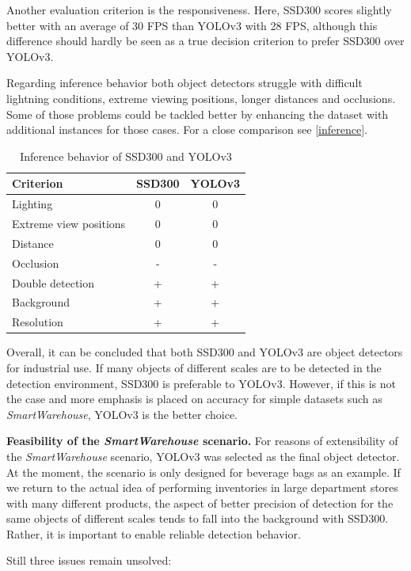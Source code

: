 \documentclass[a4paper, 10pt, journal]{wissarbIEEE}      %
\begin{document}
Another evaluation criterion is the responsiveness. Here, SSD300 scores slightly better with an average of 30 FPS than YOLOv3 with 28 FPS, although this difference should hardly be seen as a true decision criterion to prefer SSD300 over YOLOv3.

Regarding inference behavior both object detectors struggle with difficult lightning conditions, extreme viewing positions, longer distances and occlusions. Some of those problems could be tackled better by enhancing the dataset with additional instances for those cases. For a close comparison see \autoref{inference}. 

\begin{table}[h]
	\caption{Inference behavior of SSD300 and YOLOv3}
	\begin{tabularx}{0.48\textwidth}{lcc}
		\toprule 
		Criterion & SSD300 & YOLOv3 \\
		\midrule
		Lighting & 0 & 0 \\
		Extreme view positions & 0 & 0 \\
		Distance & 0 & 0 \\
		Occlusion & - & - \\
		Double detection & + & + \\
		Background & + & + \\
		Resolution & + & + \\
		\bottomrule
	\end{tabularx}  \label{inference}
\end{table}
 
Overall, it can be concluded that both SSD300 and YOLOv3 are object detectors for industrial use. If many objects of different scales are to be detected in the detection environment, SSD300 is preferable to YOLOv3. However, if this is not the case and more emphasis is placed on accuracy for simple datasets such as \textit{SmartWarehouse}, YOLOv3 is the better choice.

\textbf{Feasibility of the \textit{SmartWarehouse} scenario.} For reasons of extensibility of the \textit{SmartWarehouse} scenario, YOLOv3 was selected as the final object detector. At the moment, the scenario is only designed for beverage bags as an example. If we return to the actual idea of performing inventories in large department stores with many different products, the aspect of better precision of detection for the same objects of different scales tends to fall into the background with SSD300. Rather, it is important to enable reliable detection behavior.

Still three issues remain unsolved:
\end{document}
